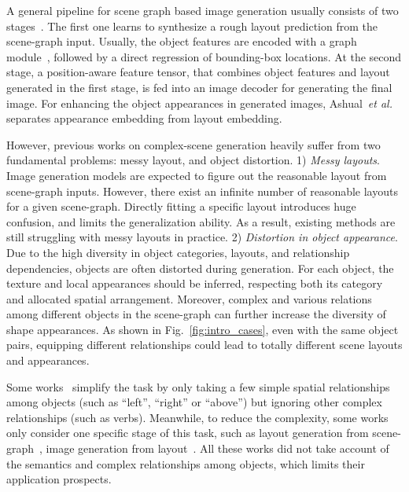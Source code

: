 A general pipeline for scene graph based image generation usually consists of two stages~\cite{johnson2018image}. The first one learns to synthesize a rough layout prediction from the scene-graph input. Usually, the object features are encoded with a graph module~\cite{johnson2018image, ashual2019specifying}, followed by a direct regression of bounding-box locations. At the second stage, a position-aware feature tensor, that combines object features and layout generated in the first stage, is fed into an image decoder for generating the final image. For enhancing the object appearances in generated images, Ashual~\textit{et al.} separates appearance embedding from layout embedding. 

However, previous works on complex-scene generation heavily suffer from two fundamental problems: messy layout, and object distortion.
%
1) \textit{Messy layouts}. Image generation models are expected to figure out the reasonable layout from scene-graph inputs. However, there exist an infinite number of reasonable layouts for a given scene-graph. Directly fitting a specific layout introduces huge confusion, and limits the generalization ability. As a result, existing methods are still struggling with messy layouts in practice. 
2) \textit{Distortion in object appearance}. Due to the high diversity in object categories, layouts, and relationship dependencies, objects are often distorted during generation. For each object, the texture and local appearances should be inferred, respecting both its category and allocated spatial arrangement. Moreover, complex and various relations among different objects in the scene-graph can further increase the diversity of shape appearances. As shown in Fig.~\ref{fig:intro_cases}, even with the same object pairs, equipping different relationships could lead to totally different scene layouts and appearances. 

Some works~\cite{ashual2019specifying} simplify the task by only taking a few simple spatial relationships among objects (such as ``left'', ``right'' or ``above'') but ignoring other complex relationships (such as verbs). Meanwhile, to reduce the complexity, some works only consider one specific stage of this task, such as layout generation from scene-graph~\cite{jyothi2019layoutvae}, image generation from layout~\cite{zhao2018image, sun2019image}. All these works did not take account of the semantics and complex relationships among objects, which limits their application prospects.


